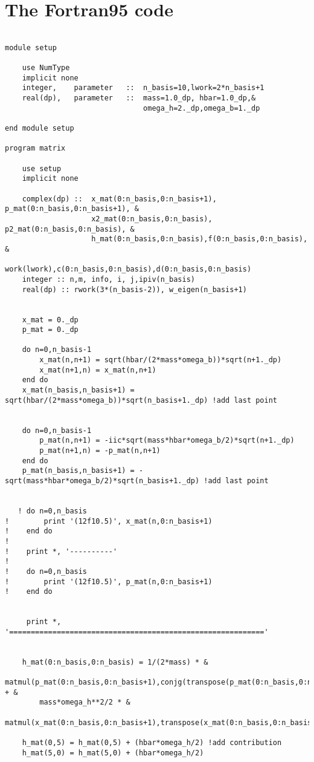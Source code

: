 \documentclass[12pt]{article}
\begin{document}
\section{The Fortran95 code}

\begin{lstlisting}[frame=single,caption={ {\tt mtestthisone.f95}},label=module]

module setup

	use NumType
	implicit none
	integer,	parameter	::	n_basis=10,lwork=2*n_basis+1
	real(dp),	parameter	::	mass=1.0_dp, hbar=1.0_dp,&
							  	omega_h=2._dp,omega_b=1._dp

end module setup

program matrix

	use setup
	implicit none

	complex(dp) ::	x_mat(0:n_basis,0:n_basis+1), p_mat(0:n_basis,0:n_basis+1), &
					x2_mat(0:n_basis,0:n_basis), p2_mat(0:n_basis,0:n_basis), &
					h_mat(0:n_basis,0:n_basis),f(0:n_basis,0:n_basis), &
                    work(lwork),c(0:n_basis,0:n_basis),d(0:n_basis,0:n_basis)
    integer :: n,m, info, i, j,ipiv(n_basis)
    real(dp) :: rwork(3*(n_basis-2)), w_eigen(n_basis+1)


	x_mat = 0._dp
    p_mat = 0._dp

	do n=0,n_basis-1
		x_mat(n,n+1) = sqrt(hbar/(2*mass*omega_b))*sqrt(n+1._dp)
		x_mat(n+1,n) = x_mat(n,n+1)		
	end do
	x_mat(n_basis,n_basis+1) = sqrt(hbar/(2*mass*omega_b))*sqrt(n_basis+1._dp) !add last point


    do n=0,n_basis-1
        p_mat(n,n+1) = -iic*sqrt(mass*hbar*omega_b/2)*sqrt(n+1._dp)
        p_mat(n+1,n) = -p_mat(n,n+1)     
    end do
    p_mat(n_basis,n_basis+1) = -sqrt(mass*hbar*omega_b/2)*sqrt(n_basis+1._dp) !add last point


   ! do n=0,n_basis
!        print '(12f10.5)', x_mat(n,0:n_basis+1)
!    end do
!
!    print *, '----------'
!
!    do n=0,n_basis
!        print '(12f10.5)', p_mat(n,0:n_basis+1)
!    end do


     print *, '==========================================================='


    h_mat(0:n_basis,0:n_basis) = 1/(2*mass) * &
        matmul(p_mat(0:n_basis,0:n_basis+1),conjg(transpose(p_mat(0:n_basis,0:n_basis+1)))) + &
        mass*omega_h**2/2 * &
        matmul(x_mat(0:n_basis,0:n_basis+1),transpose(x_mat(0:n_basis,0:n_basis+1)))
        
    h_mat(0,5) = h_mat(0,5) + (hbar*omega_h/2) !add contribution
    h_mat(5,0) = h_mat(5,0) + (hbar*omega_h/2)
    

\end{lstlisting}
\end{document}
